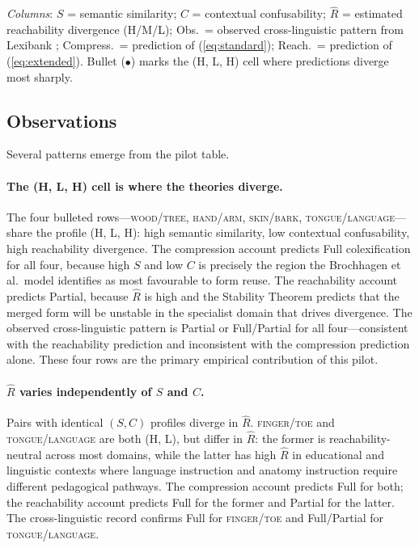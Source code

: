 \documentclass[12pt]{article}
\theoremstyle{rthm}
\theoremstyle{rdef}
\theoremstyle{remark}
\begin{document}
\smallskip
\noindent\small
\textit{Columns}: $S$ = semantic similarity; $C$ = contextual confusability;
$\widehat{R}$ = estimated reachability divergence (H/M/L); Obs.\ = observed
cross-linguistic pattern from Lexibank \cite{list2022}; Compress.\ = prediction
of (\ref{eq:standard}); Reach.\ = prediction of (\ref{eq:extended}).
Bullet ($\bullet$) marks the (H, L, H) cell where predictions diverge most
sharply.
\normalsize

\subsection{Observations}

Several patterns emerge from the pilot table.

\paragraph{The (H, L, H) cell is where the theories diverge.}
The four bulleted rows---\textsc{wood/tree}, \textsc{hand/arm},
\textsc{skin/bark}, \textsc{tongue/language}---share the profile (H, L, H):
high semantic similarity, low contextual confusability, high reachability
divergence. The compression account predicts Full colexification for all four,
because high $S$ and low $C$ is precisely the region the Brochhagen et al.\
model identifies as most favourable to form reuse. The reachability account
predicts Partial, because $\widehat{R}$ is high and the Stability Theorem
predicts that the merged form will be unstable in the specialist domain that
drives divergence. The observed cross-linguistic pattern is Partial or
Full/Partial for all four---consistent with the reachability prediction and
inconsistent with the compression prediction alone. These four rows are the
primary empirical contribution of this pilot.

\paragraph{$\widehat{R}$ varies independently of $S$ and $C$.}
Pairs with identical $(S, C)$ profiles diverge in $\widehat{R}$.
\textsc{finger/toe} and \textsc{tongue/language} are both (H, L), but differ
in $\widehat{R}$: the former is reachability-neutral across most domains,
while the latter has high $\widehat{R}$ in educational and linguistic contexts
where language instruction and anatomy instruction require different pedagogical
pathways. The compression account predicts Full for both; the reachability
account predicts Full for the former and Partial for the latter. The
cross-linguistic record confirms Full for \textsc{finger/toe} and Full/Partial
for \textsc{tongue/language}.
\end{document}
